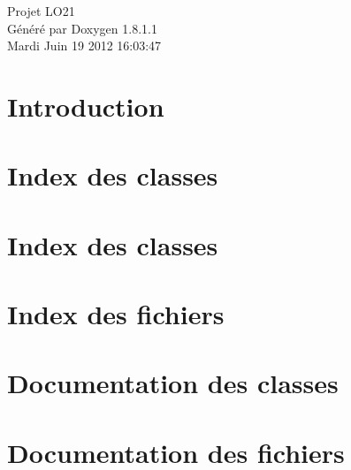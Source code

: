 \documentclass{book}
\begin{document}
\hypersetup{pageanchor=false,citecolor=blue}
\begin{titlepage}
\vspace*{7cm}
\begin{center}
{\Large Projet L\-O21 }\\
\vspace*{1cm}
{\large Généré par Doxygen 1.8.1.1}\\
\vspace*{0.5cm}
{\small Mardi Juin 19 2012 16:03:47}\\
\end{center}
\end{titlepage}
\clearemptydoublepage
{}
\tableofcontents
\clearemptydoublepage
{}
\hypersetup{pageanchor=true,citecolor=blue}
\chapter{Introduction}
\label{index}\hypertarget{index}{}
\chapter{Index des classes}

\chapter{Index des classes}

\chapter{Index des fichiers}

\chapter{Documentation des classes}

















\chapter{Documentation des fichiers}



















\printindex
\end{document}

